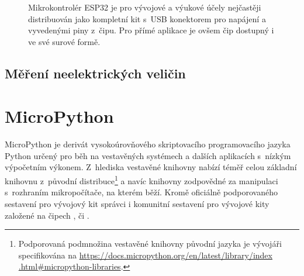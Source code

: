 \begin{figure}
    \centering
    \quad%

    \caption{Mikrokontrolér ESP32 je pro vývojové a výukové účely nejčastěji distribuován jako kompletní kit s~USB
    konektorem pro napájení a vyvedenými piny z~čipu. %
    Pro přímé aplikace je ovšem čip dostupný i ve své surové formě.}
    \label{fig:esp32}
\end{figure}

\addtocounter{footnote}{-1}


\subsection{Měření neelektrických veličin}

\section{MicroPython}\label{sec:micropython}
MicroPython je derivát vysokoúrovňového skriptovacího programovacího jazyka Python určený pro běh na vestavěných
systémech a dalších aplikacích s~nízkým výpočetním výkonem.
Z~hlediska vestavěné knihovny nabízí téměř celou základní knihovnu z~původní distribuce\footnote{Podporovaná podmnožina
vestavěné knihovny původní jazyka je vývojáři specifikována na \url{https://docs.micropython.org/en/latest/library/index
.html\#micropython-libraries}.} a navíc knihovny
zodpovědné za manipulaci s~rozhraním mikropočítače, na kterém běží.
Kromě oficiálně podporovaného sestavení pro vývojový kit  správci i komunitní sestavení pro
vývojové kity založené na čipech ,  či .

